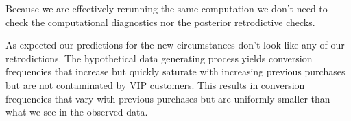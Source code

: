 \documentclass[
  letterpaper,
  DIV=11,
  numbers=noendperiod]{scrartcl}
\newenvironment{Shaded}{\begin{snugshade}}{\end{snugshade}}
\newcommand{\AttributeTok}[1]{\textcolor[rgb]{0.40,0.45,0.13}{#1}}
\newcommand{\ControlFlowTok}[1]{\textcolor[rgb]{0.00,0.23,0.31}{#1}}
\newcommand{\DecValTok}[1]{\textcolor[rgb]{0.68,0.00,0.00}{#1}}
\newcommand{\FunctionTok}[1]{\textcolor[rgb]{0.28,0.35,0.67}{#1}}
\newcommand{\NormalTok}[1]{\textcolor[rgb]{0.00,0.23,0.31}{#1}}
\newcommand{\OtherTok}[1]{\textcolor[rgb]{0.00,0.23,0.31}{#1}}
\newcommand{\SpecialCharTok}[1]{\textcolor[rgb]{0.37,0.37,0.37}{#1}}
\newcommand{\StringTok}[1]{\textcolor[rgb]{0.13,0.47,0.30}{#1}}
\begin{document}
\begin{Shaded}
\end{Shaded}

Because we are effectively rerunning the same computation we don't need
to check the computational diagnostics nor the posterior retrodictive
checks.

As expected our predictions for the new circumstances don't look like
any of our retrodictions. The hypothetical data generating process
yields conversion frequencies that increase but quickly saturate with
increasing previous purchases but are not contaminated by VIP customers.
This results in conversion frequencies that vary with previous purchases
but are uniformly smaller than what we see in the observed data.

\begin{Shaded}
\end{Shaded}
\end{document}
